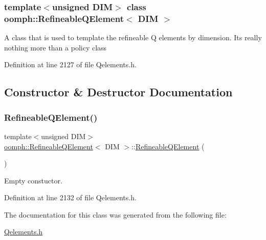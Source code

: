 \subsubsection*{template$<$unsigned D\+IM$>$\newline
class oomph\+::\+Refineable\+Q\+Element$<$ D\+I\+M $>$}

A class that is used to template the refineable Q elements by dimension. It\textquotesingle{}s really nothing more than a policy class 

Definition at line 2127 of file Qelements.\+h.



\subsection{Constructor \& Destructor Documentation}
\mbox{\label{classoomph_1_1RefineableQElement_af183085df5914c6834d6fe88e817ee01}} 
\subsubsection{\texorpdfstring{Refineable\+Q\+Element()}{RefineableQElement()}}
{\footnotesize\ttfamily template$<$unsigned D\+IM$>$ \\
\hyperlink{classoomph_1_1RefineableQElement}{oomph\+::\+Refineable\+Q\+Element}$<$ D\+IM $>$\+::\hyperlink{classoomph_1_1RefineableQElement}{Refineable\+Q\+Element} (\begin{DoxyParamCaption}{ }\end{DoxyParamCaption})\hspace{0.3cm}{\ttfamily [inline]}}



Empty constuctor. 



Definition at line 2132 of file Qelements.\+h.



The documentation for this class was generated from the following file\+:\begin{DoxyCompactItemize}
\item 
\hyperlink{Qelements_8h}{Qelements.\+h}\end{DoxyCompactItemize}

